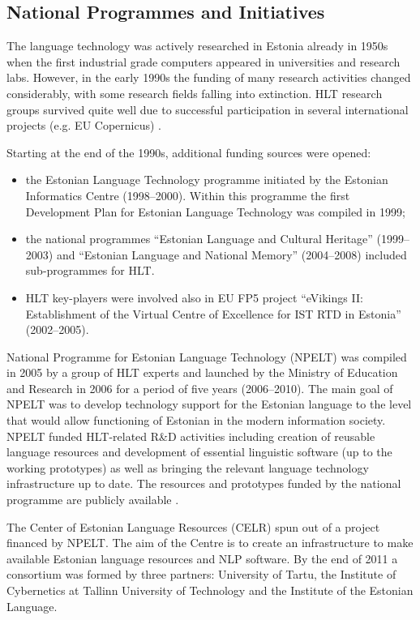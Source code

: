 \documentclass[]{../metanetpaper}
\begin{document}
\begin{multicols}{2}
\subsection{National Programmes and Initiatives}

The language technology was actively researched in Estonia already in 1950s when the first industrial grade computers appeared in universities and research labs. 
However, in the early 1990s the funding of many research activities changed considerably, with some research fields falling into extinction. 
HLT research groups survived quite well due to successful participation in several international projects (e.g. EU Copernicus) \cite{Meisteretal}.

Starting at the end of the 1990s, additional funding sources were opened: 
\begin{itemize}
 \item the Estonian Language Technology programme initiated by the Estonian Informatics Centre (1998--2000). Within this programme the first Development Plan for Estonian Language Technology was compiled in 1999;
 \item the national programmes ``Estonian Language and Cultural
   Heritage'' (1999--2003) and ``Estonian Language and National
   Memory'' (2004--2008) included sub-programmes for HLT. 
 \item HLT key-players were involved also in EU FP5 project ``eVikings II: Establishment of the Virtual Centre of Excellence for IST RTD in Estonia'' (2002--2005).
\end{itemize}

National Programme for Estonian Language Technology (NPELT) was compiled in 2005 by a group of HLT experts and launched by the Ministry of Education and Research in 2006 for a period of five years (2006--2010). 
The main goal of NPELT was to develop technology support for the Estonian language to the level that would allow functioning of Estonian in the modern information society. 
NPELT funded HLT-related R\&D activities including creation of reusable language resources and development of essential linguistic software (up to the working prototypes) as well as bringing the relevant language technology infrastructure up to date. 
The resources and prototypes funded by the national programme are publicly available \cite{ekktt}.

The Center of Estonian Language Resources (CELR) spun out of a project financed by NPELT. The aim of the Centre is to create an infrastructure to make available Estonian language resources and NLP software. By the end of 2011 a consortium was
formed by three partners: University of Tartu, the Institute of Cybernetics at Tallinn University of Technology and the Institute of the Estonian Language.


\end{multicols}
\end{document}
